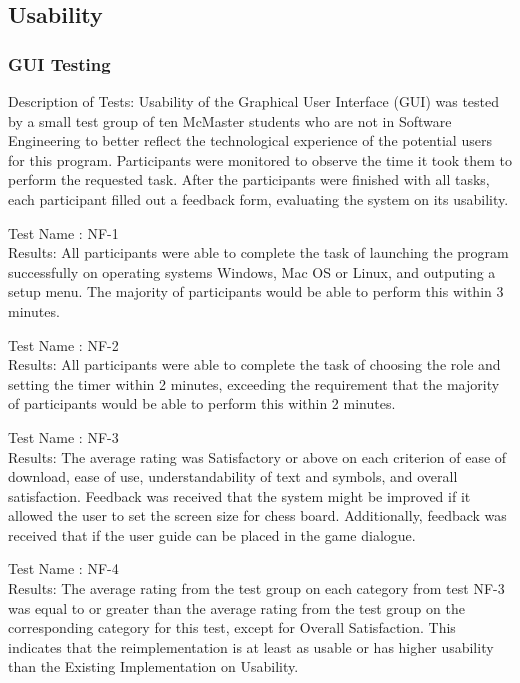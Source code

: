 \documentclass[12pt, titlepage]{article}
\begin{document}
\subsection{Usability}
\subsubsection{GUI Testing}
Description of Tests: Usability of the Graphical User Interface (GUI) was tested by a small test group of ten McMaster students who are not in Software Engineering to better reflect the technological experience of the potential users for this program. Participants were monitored to observe the time it took them to perform the requested task.
After the participants were finished with all tasks, each participant filled out a feedback form, evaluating the system on its usability.
\item{Test Name : NF-1\\}
Results: All participants were able to complete the task of launching the program successfully on operating systems Windows, Mac OS or Linux, and outputing a setup menu. The majority of participants would be able to perform this within 3 minutes.\\

\item{Test Name : NF-2\\}
Results: All participants were able to complete the task of choosing the role and setting the timer within 2 minutes, exceeding the requirement that the majority of participants would be able to perform this within 2 minutes.\\

\item{Test Name : NF-3\\}
Results: The average rating was Satisfactory or above on each criterion of ease of download, ease of use, understandability of text and symbols, and overall satisfaction. Feedback was received that the system might be improved if it allowed the user to set the screen size for chess board. Additionally, feedback was received that if the user guide can be placed in the game dialogue.\\

\item{Test Name : NF-4\\}
Results: The average rating from the test group on each category from test NF-3 was equal to or greater than the average rating from the test group on the corresponding category for this test, except for Overall Satisfaction. This indicates that the reimplementation is at least as usable or has higher usability than the Existing Implementation on Usability. \\
\end{document}
